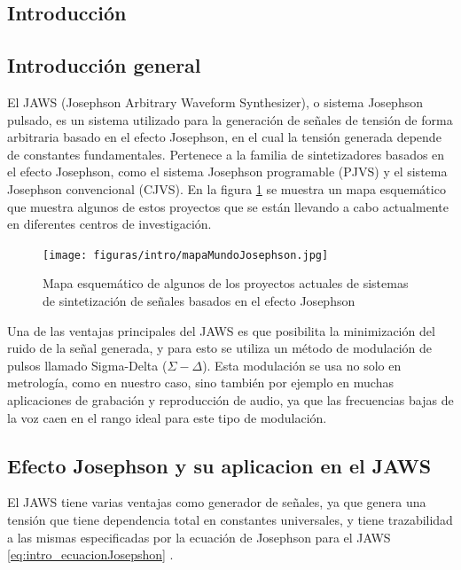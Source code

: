 \documentclass[twoside]{article}
\begin{document}
\begin{multicols}{2}

\section{Introducción}

\subsection{Introducción general} %

El JAWS (Josephson Arbitrary Waveform Synthesizer), o sistema Josephson pulsado, es un sistema utilizado para la generación de señales de tensión de forma arbitraria basado en el efecto Josephson, en el cual la tensión generada depende de constantes fundamentales. Pertenece a la familia de sintetizadores basados en el efecto Josephson, como el sistema Josephson programable (PJVS) y el sistema Josephson convencional (CJVS). En la figura \ref{fig:intro_mapaMundoJosephson} se muestra un mapa esquemático que muestra algunos de estos proyectos que se están llevando a cabo actualmente en diferentes centros de investigación.
\begin{figure}[H]
    \centering
    \texttt{[image: figuras/intro/mapaMundoJosephson.jpg]}
    \caption{Mapa esquemático de algunos de los proyectos actuales de sistemas de sintetización de señales basados en el efecto Josephson}
    \label{fig:intro_mapaMundoJosephson}
\end{figure}

Una de las ventajas principales del JAWS es que posibilita la minimización del ruido de la señal generada, y para esto se utiliza un método de modulación de pulsos llamado Sigma-Delta ($\Sigma-\Delta$). Esta modulación se usa no solo en metrología, como en nuestro caso, sino también por ejemplo en muchas aplicaciones de grabación y reproducción de audio, ya que las frecuencias bajas de la voz caen en el rango ideal para este tipo de modulación. \cite{SigmaDeltaMT022}

\subsection{Efecto Josephson y su aplicacion en el JAWS}

El JAWS tiene varias ventajas como generador de señales, ya que genera una tensión que tiene dependencia total en constantes universales, y tiene trazabilidad a las mismas especificadas por la ecuación de Josephson para el JAWS \ref{eq:intro_ecuacionJosepshon} \cite{behr2012}.


\end{multicols}
\end{document}

